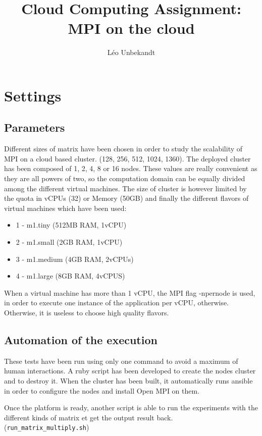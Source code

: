 \documentclass[a4paper,11pt]{article}
\title{Cloud Computing Assignment: MPI on the cloud}
\author{Léo Unbekandt}
\begin{document}
\maketitle
\tableofcontents

\section{Settings}
\subsection{Parameters}

Different sizes of matrix have been chosen in order to study the scalability of
MPI on a cloud based cluster. (128, 256, 512, 1024, 1360). The deployed cluster has been
composed of 1, 2, 4, 8 or 16 nodes. These values are really convenient as they are
all powers of two, so the computation domain can be equally divided among the
different virtual machines. The size of cluster is however limited by the quota
in vCPUs (32) or Memory (50GB) and finally the different flavors of virtual machines
which have been used:

\begin{itemize}
  \item 1 - m1.tiny (512MB RAM, 1vCPU)
  \item 2 - m1.small (2GB RAM, 1vCPU)
  \item 3 - m1.medium (4GB RAM, 2vCPUs)
  \item 4 - m1.large (8GB RAM, 4vCPUS)
\end{itemize}

When a virtual machine has more than 1 vCPU, the MPI flag -npernode is used, in order
to execute one instance of the application per vCPU, otherwise. Otherwise, it is
useless to choose high quality flavors.

\subsection{Automation of the execution}

These tests have been run using only one command to avoid a maximum of human
interactions. A ruby script has been developed to create the nodes cluster and to
destroy it. When the cluster has been built, it automatically runs ansible in
order to configure the nodes and install Open MPI on them.

Once the platform is ready, another script is able to run the experiments with
the different kinds of matrix et get the output result back. (\texttt{run\_matrix\_multiply.sh})
\end{document}
